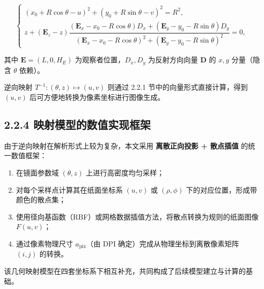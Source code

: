 \documentclass{ctexart}
\begin{document}
\[
\begin{cases}
(x_0+R\cos\theta-u)^2+(y_0+R\sin\theta-v)^2=R^2,\\[4pt]
z+(\mathbf{E}_z-z)\dfrac{(\mathbf{E}_x-x_0-R\cos\theta)D_x+(\mathbf{E}_y-y_0-R\sin\theta)D_y}{(\mathbf{E}_x-x_0-R\cos\theta)^2+(\mathbf{E}_y-y_0-R\sin\theta)^2}=0,
\end{cases}
\]

其中 $\mathbf{E}=(L,0,H_E)$ 为观察者位置，$D_x,D_y$ 为反射方向向量 $\mathbf{D}$ 的 $x,y$ 分量（隐含 $\theta$ 依赖）。

逆向映射 $T^{-1}:(\theta,z)\mapsto(u,v)$ 则通过 2.2.1 节中的向量形式直接计算，得到 $(u,v)$ 后可方便地转换为像素坐标进行图像生成。

\subsection{2.2.4 映射模型的数值实现框架}

由于逆向映射在解析形式上较为复杂，本文采用 \textbf{离散正向投影 + 散点插值} 的统一数值框架：

\begin{enumerate}
\item 在镜面参数域 $(\theta,z)$ 上进行高密度均匀采样；
\item 对每个采样点计算其在纸面坐标系 $(u,v)$ 或 $(\rho,\phi)$ 下的对应位置，形成带颜色的散点集；
\item 使用径向基函数（RBF）或网格数据插值方法，将散点转换为规则的纸面图像 $F(u,v)$；
\item 通过像素物理尺寸 $a_{\text{pix}}$（由 DPI 确定）完成从物理坐标到离散像素矩阵 $(i,j)$ 的转换。
\end{enumerate}

该几何映射模型在四套坐标系下相互补充，共同构成了后续模型建立与计算的基础。
\end{document}
